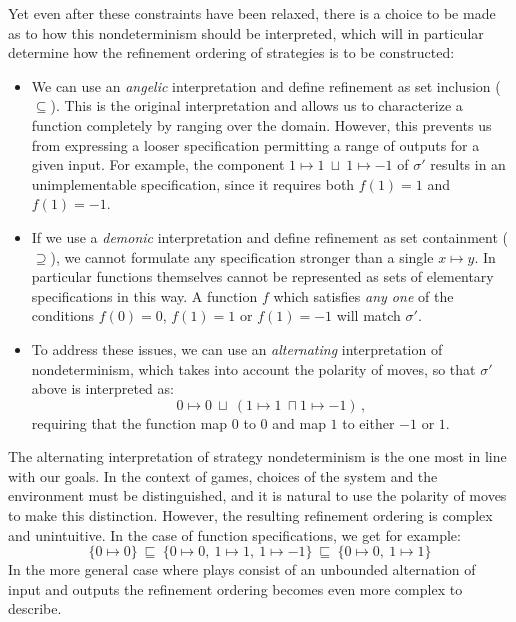 \documentclass[draft,11pt]{report}
\theoremstyle{definition}
\begin{document}
Yet even after these constraints have been relaxed,
there is a choice to be made as to how
this nondeterminism should be interpreted,
which will in particular determine
how the refinement ordering of strategies
is to be constructed:
\begin{itemize}
  \item We can use an \emph{angelic} interpretation
    and define refinement as set inclusion ($\subseteq$).
    This is the original interpretation
    and allows us to characterize a function completely
    by ranging over the domain.
    However, this prevents us from expressing a looser specification
    permitting a range of outputs for a given input.
    For example, the component
    $1 \mapsto 1 \: \sqcup \: 1 \mapsto -1$ of $\sigma'$
    results in an unimplementable specification,
    since it requires both
    $f(1) = 1$ and $f(1) = -1$.
  \item If we use a \emph{demonic} interpretation
    and define refinement as set containment ($\supseteq$),
    we cannot formulate any specification
    stronger than a single $x \mapsto y$.
    In particular functions themselves cannot be represented as
    sets of elementary specifications in this way.
    A function $f$
    which satisfies \emph{any one} of the conditions
    $f(0) = 0$, $f(1) = 1$ or $f(1) = -1$ will
    match $\sigma'$.
  \item
    To address these issues,
    we can use an \emph{alternating} interpretation of nondeterminism,
    which takes into account the polarity of moves,
    so that $\sigma'$ above is interpreted as:
    \[
      0 \mapsto 0 \: \sqcup \:
      (1 \mapsto 1 \: \sqcap 1 \mapsto -1)
      \,,
    \]
    requiring that the function
    map $0$ to $0$ and
    map $1$ to either $-1$ or $1$.
\end{itemize}

The alternating interpretation of strategy nondeterminism
is the one most in line with our goals.
In the context of games,
choices of the system and the environment must be distinguished,
and it is natural to use the polarity of moves
to make this distinction.
However,
the resulting refinement ordering
is complex and unintuitive.
In the case of function specifications,
we get for example:
\[
  \{ 0 \mapsto 0 \}
  \: \sqsubseteq \:
  \{ 0 \mapsto 0, \: 1 \mapsto 1, \: 1 \mapsto -1 \}
  \: \sqsubseteq \:
  \{ 0 \mapsto 0, \: 1 \mapsto 1 \}
\]
In the more general case where plays consist of
an unbounded alternation of input and outputs
the refinement ordering becomes even more
complex to describe.
\end{document}

